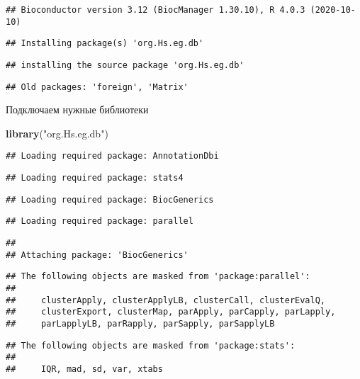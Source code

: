 \documentclass[
]{article}
\newenvironment{Shaded}{\begin{snugshade}}{\end{snugshade}}
\newcommand{\KeywordTok}[1]{\textcolor[rgb]{0.13,0.29,0.53}{\textbf{#1}}}
\newcommand{\NormalTok}[1]{#1}
\newcommand{\StringTok}[1]{\textcolor[rgb]{0.31,0.60,0.02}{#1}}
\begin{document}
\begin{verbatim}
## Bioconductor version 3.12 (BiocManager 1.30.10), R 4.0.3 (2020-10-10)
\end{verbatim}

\begin{verbatim}
## Installing package(s) 'org.Hs.eg.db'
\end{verbatim}

\begin{verbatim}
## installing the source package 'org.Hs.eg.db'
\end{verbatim}

\begin{verbatim}
## Old packages: 'foreign', 'Matrix'
\end{verbatim}

Подключаем нужные библиотеки

\begin{Shaded}
\begin{Highlighting}[]
\KeywordTok{library}\NormalTok{(}\StringTok{"org.Hs.eg.db"}\NormalTok{)}
\end{Highlighting}
\end{Shaded}

\begin{verbatim}
## Loading required package: AnnotationDbi
\end{verbatim}

\begin{verbatim}
## Loading required package: stats4
\end{verbatim}

\begin{verbatim}
## Loading required package: BiocGenerics
\end{verbatim}

\begin{verbatim}
## Loading required package: parallel
\end{verbatim}

\begin{verbatim}
## 
## Attaching package: 'BiocGenerics'
\end{verbatim}

\begin{verbatim}
## The following objects are masked from 'package:parallel':
## 
##     clusterApply, clusterApplyLB, clusterCall, clusterEvalQ,
##     clusterExport, clusterMap, parApply, parCapply, parLapply,
##     parLapplyLB, parRapply, parSapply, parSapplyLB
\end{verbatim}

\begin{verbatim}
## The following objects are masked from 'package:stats':
## 
##     IQR, mad, sd, var, xtabs
\end{verbatim}
\end{document}
